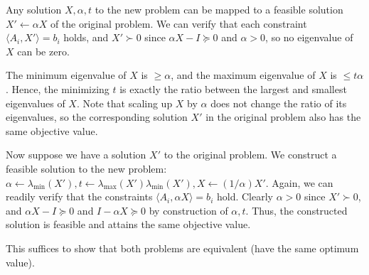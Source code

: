 \documentclass[11pt,letterpaper]{article}
\theoremstyle{definition}
\begin{document}
Any solution $X,\alpha,t$ to the new problem can be mapped to a feasible solution $X'\gets \alpha X$ of the original problem.
We can verify that each constraint $\langle A_i, X' \rangle = b_i$ holds, and $X'\succ 0$ since $\alpha X-I\succeq 0$ and $\alpha>0$, so no eigenvalue of $X$ can be zero.

The minimum eigenvalue of $X$ is $\geq \alpha$, and the maximum eigenvalue of $X$ is $\leq t\alpha$. 
Hence, the minimizing $t$ is exactly the ratio between the largest and smallest eigenvalues of $X$.
Note that scaling up $X$ by $\alpha$ does not change the ratio of its eigenvalues, so the corresponding solution $X'$ in the original problem also has the same objective value.

Now suppose we have a solution $X'$ to the original problem.
We construct a feasible solution to the new problem: $\alpha\gets \lambda_{\min}(X'), t\gets \lambda_{\max}(X') \lambda_{\min}(X'), X\gets (1/\alpha)X'$.
Again, we can readily verify that the constraints $\langle A_i, \alpha X \rangle = b_i$ hold.
Clearly $\alpha>0$ since $X'\succ 0$, and $\alpha X - I \succeq 0$ and $I - \alpha X \succeq 0$ by construction of $\alpha, t$.
Thus, the constructed solution is feasible and attains the same objective value.

This suffices to show that both problems are equivalent (have the same optimum value).




\end{document}
